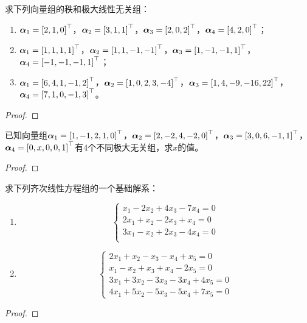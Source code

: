 \begin{problem}\label{problem-2.26}
求下列向量组的秩和极大线性无关组：
\begin{enumerate}
    \item \(\boldsymbol{\alpha}_1=\left[ 2,1,0 \right]^\top\)，\(\boldsymbol{\alpha}_2=\left[ 3,1,1 \right]^\top\)，\(\boldsymbol{\alpha}_3=\left[ 2,0,2 \right]^\top\)，\(\boldsymbol{\alpha}_4=\left[ 4,2,0 \right]^\top\)；
    \item \(\boldsymbol{\alpha}_1=\left[ 1,1,1,1 \right]^\top\)，\(\boldsymbol{\alpha}_2=\left[ 1,1,-1,-1 \right]^\top\)，\(\boldsymbol{\alpha}_3=\left[ 1,-1,-1,1 \right]^\top\)，\(\boldsymbol{\alpha}_4=\left[ -1,-1,-1,1 \right]^\top\)；
    \item \(\boldsymbol{\alpha}_1=\left[ 6,4,1,-1,2 \right]^\top\)，\(\boldsymbol{\alpha}_2=\left[ 1,0,2,3,-4 \right]^\top\)，\(\boldsymbol{\alpha}_3=\left[ 1,4,-9,-16,22 \right]^\top\)，\(\boldsymbol{\alpha}_4=\left[ 7,1,0,-1,3 \right]^\top\)。
\end{enumerate}
\end{problem}
\begin{proof}

\end{proof}

\begin{problem}\label{problem-2.27}
已知向量组\(\boldsymbol{\alpha}_1=\left[ 1,-1,2,1,0 \right]^\top\)，\(\boldsymbol{\alpha}_2=\left[ 2,-2,4,-2,0 \right]^\top\)，\(\boldsymbol{\alpha}_3=\left[ 3,0,6,-1,1 \right]^\top\)，\(\boldsymbol{\alpha}_4=\left[ 0,x,0,0,1 \right]^\top\)有\(4\)个不同极大无关组，求\(x\)的值。
\end{problem}
\begin{proof}
\end{proof}

\begin{problem}\label{problem-2.28}
求下列齐次线性方程组的一个基础解系：
\begin{enumerate}
    \item \begin{equation*}
              \begin{cases}
                  x_1-2x_2+4x_3-7x_4=0 \\
                  2x_1+x_2-2x_3+x_4=0  \\
                  3x_1-x_2+2x_3-4x_4=0 \\
              \end{cases}
          \end{equation*}
    \item \begin{equation*}
              \begin{cases}
                  2x_1+x_2-x_3-x_4+x_5=0     \\
                  x_1-x_2+x_3+x_4-2x_5=0     \\
                  3x_1+3x_2-3x_3-3x_4+4x_5=0 \\
                  4x_1+5x_2-5x_3-5x_4+7x_5=0
              \end{cases}
          \end{equation*}
\end{enumerate}
\end{problem}
\begin{proof}
\end{proof}


